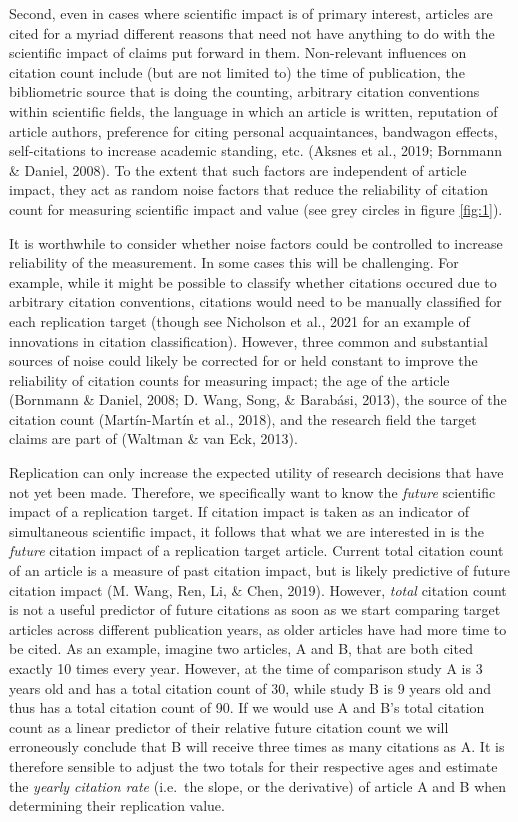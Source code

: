 \documentclass[
  english,
  man,floatsintext]{apa6}
\begin{document}
Second, even in cases where scientific impact is of primary interest, articles are cited for a myriad different reasons that need not have anything to do with the scientific impact of claims put forward in them. Non-relevant influences on citation count include (but are not limited to) the time of publication, the bibliometric source that is doing the counting, arbitrary citation conventions within scientific fields, the language in which an article is written, reputation of article authors, preference for citing personal acquaintances, bandwagon effects, self-citations to increase academic standing, etc. (Aksnes et al., 2019; Bornmann \& Daniel, 2008). To the extent that such factors are independent of article impact, they act as random noise factors that reduce the reliability of citation count for measuring scientific impact and value (see grey circles in figure \ref{fig:1}).

It is worthwhile to consider whether noise factors could be controlled to increase reliability of the measurement. In some cases this will be challenging. For example, while it might be possible to classify whether citations occured due to arbitrary citation conventions, citations would need to be manually classified for each replication target (though see Nicholson et al., 2021 for an example of innovations in citation classification). However, three common and substantial sources of noise could likely be corrected for or held constant to improve the reliability of citation counts for measuring impact; the age of the article (Bornmann \& Daniel, 2008; D. Wang, Song, \& Barabási, 2013), the source of the citation count (Martín-Martín et al., 2018), and the research field the target claims are part of (Waltman \& van Eck, 2013).

Replication can only increase the expected utility of research decisions that have not yet been made. Therefore, we specifically want to know the \emph{future} scientific impact of a replication target. If citation impact is taken as an indicator of simultaneous scientific impact, it follows that what we are interested in is the \emph{future} citation impact of a replication target article. Current total citation count of an article is a measure of past citation impact, but is likely predictive of future citation impact (M. Wang, Ren, Li, \& Chen, 2019). However, \emph{total} citation count is not a useful predictor of future citations as soon as we start comparing target articles across different publication years, as older articles have had more time to be cited. As an example, imagine two articles, A and B, that are both cited exactly 10 times every year. However, at the time of comparison study A is 3 years old and has a total citation count of 30, while study B is 9 years old and thus has a total citation count of 90. If we would use A and B's total citation count as a linear predictor of their relative future citation count we will erroneously conclude that B will receive three times as many citations as A. It is therefore sensible to adjust the two totals for their respective ages and estimate the \emph{yearly citation rate} (i.e.~the slope, or the derivative) of article A and B when determining their replication value.
\end{document}
